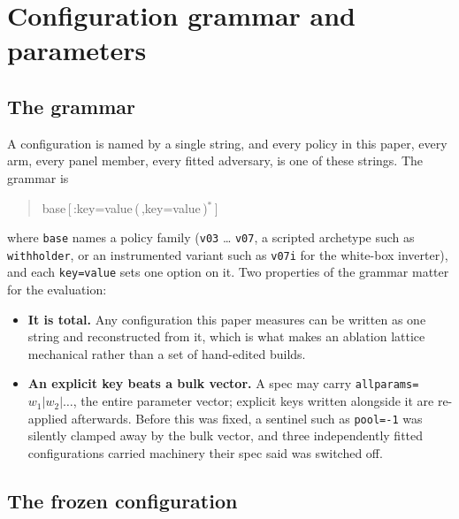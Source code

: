 \section{Configuration grammar and parameters}
\label{app:parameters}

\subsection*{The grammar}

A configuration is named by a single string, and every policy in this paper, every arm, every
panel member, every fitted adversary, is one of these strings. The grammar is

\begin{quote}\ttfamily
base\,\textup{[}\,:key=value\,\textup{(}\,,key=value\,\textup{)}$^{*}$\,\textup{]}
\end{quote}

\noindent
where \texttt{base} names a policy family (\texttt{v03} \ldots{} \texttt{v07}, a scripted archetype
such as \texttt{withholder}, or an instrumented variant such as \texttt{v07i} for the white-box
inverter), and each \texttt{key=value} sets one option on it. Two properties of the grammar matter for the evaluation:

\begin{itemize}
\item \textbf{It is total.} Any configuration this paper measures can be written as one string and
      reconstructed from it, which is what makes an ablation lattice mechanical rather than a set of
      hand-edited builds.
\item \textbf{An explicit key beats a bulk vector.} A spec may carry
      \texttt{allparams=$w_1|w_2|\ldots$}, the entire parameter vector; explicit keys written
      alongside it are re-applied afterwards. Before this was fixed, a sentinel such as
      \texttt{pool=-1} was silently clamped away by the bulk vector, and three independently fitted
      configurations carried machinery their spec said was switched off.
\end{itemize}

\subsection*{The frozen configuration}

\begin{quote}\small\ttfamily\raggedright
\vsevenFrozenSpecWrapped{}
\end{quote}

